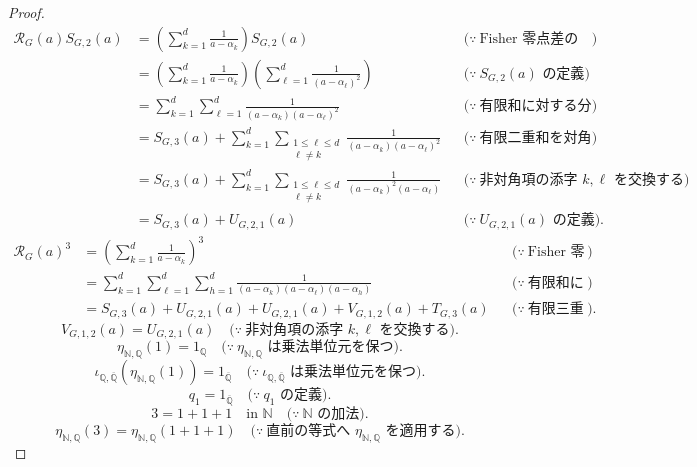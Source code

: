 \documentclass[11pt,a4paper]{article}
\theoremstyle{remark}
\begin{document}
\begin{proof}
\[\begin{aligned}
\mathcal R_G(a)S_{G,2}(a)
&=
\left(
  \sum_{k=1}^{d}\frac{1}{a-\alpha_k}
\right)
S_{G,2}(a)
&&\bigl(\because\ \text{Fisher 零点差の逆数和の定義}\bigr)\\
&=
\left(
  \sum_{k=1}^{d}\frac{1}{a-\alpha_k}
\right)
\left(
  \sum_{\ell=1}^{d}\frac{1}{(a-\alpha_\ell)^2}
\right)
&&\bigl(\because\ S_{G,2}(a)\text{ の定義}\bigr)\\
&=
\sum_{k=1}^{d}
\sum_{\ell=1}^{d}
\frac{1}{(a-\alpha_k)(a-\alpha_\ell)^2}
&&\bigl(\because\ \text{有限和に対する分配律}\bigr)\\
&=
S_{G,3}(a)
+
\sum_{k=1}^{d}
\sum_{\substack{1\le\ell\le d\\\ell\ne k}}
\frac{1}{(a-\alpha_k)(a-\alpha_\ell)^2}
&&\bigl(\because\ \text{有限二重和を対角項と非対角項へ分ける}\bigr)\\
&=
S_{G,3}(a)
+
\sum_{k=1}^{d}
\sum_{\substack{1\le\ell\le d\\\ell\ne k}}
\frac{1}{(a-\alpha_k)^2(a-\alpha_\ell)}
&&\bigl(\because\ \text{非対角項の添字 }k,\ell\text{ を交換する}\bigr)\\
&=
S_{G,3}(a)+U_{G,2,1}(a)
&&\bigl(\because\ U_{G,2,1}(a)\text{ の定義}\bigr).
\end{aligned}\]
\[\begin{aligned}
\mathcal R_G(a)^3
&=
\left(
  \sum_{k=1}^{d}\frac{1}{a-\alpha_k}
\right)^3
&&\bigl(\because\ \text{Fisher 零点差の逆数和の定義}\bigr)\\
&=
\sum_{k=1}^{d}
\sum_{\ell=1}^{d}
\sum_{h=1}^{d}
\frac{1}{(a-\alpha_k)(a-\alpha_\ell)(a-\alpha_h)}
&&\bigl(\because\ \text{有限和に対する分配律}\bigr)\\
&=
S_{G,3}(a)
+U_{G,2,1}(a)
+U_{G,2,1}(a)
+V_{G,1,2}(a)
+T_{G,3}(a)
&&\bigl(\because\ \text{有限三重和を添字の一致型ごとに分ける}\bigr).
\end{aligned}\]
\[V_{G,1,2}(a)
=U_{G,2,1}(a)
\quad\bigl(\because\ \text{非対角項の添字 }k,\ell\text{ を交換する}\bigr).\]
\[\eta_{\mathbb N,\mathbb Q}(1)=1_{\mathbb Q}
\quad\bigl(\because\ \eta_{\mathbb N,\mathbb Q}\text{ は乗法単位元を保つ}\bigr).\]
\[\iota_{\mathbb Q,\overline{\mathbb Q}}\!\left(
  \eta_{\mathbb N,\mathbb Q}(1)
\right)
=1_{\overline{\mathbb Q}}
\quad\bigl(\because\ \iota_{\mathbb Q,\overline{\mathbb Q}}\text{ は乗法単位元を保つ}\bigr).\]
\[q_1=1_{\overline{\mathbb Q}}
\quad\bigl(\because\ q_1\text{ の定義}\bigr).\]
\[3=1+1+1
\quad\text{in }\mathbb N
\quad\bigl(\because\ \mathbb N\text{ の加法}\bigr).\]
\[\eta_{\mathbb N,\mathbb Q}(3)
=\eta_{\mathbb N,\mathbb Q}(1+1+1)
\quad\bigl(\because\ \text{直前の等式へ }\eta_{\mathbb N,\mathbb Q}\text{ を適用する}\bigr).\]

\end{proof}
\end{document}
